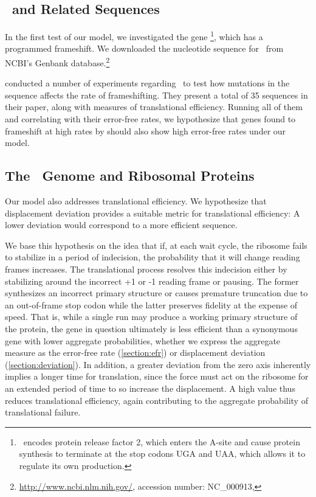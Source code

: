 \documentclass[12pt]{article}
\begin{document}
\subsection{\prfB\ and Related Sequences}
In the first test of our model, we investigated the gene
\prfB\footnote{\prfB\ encodes protein release factor 2, which enters
  the A-site and cause protein synthesis to terminate at the stop
  codons \textsc{UGA} and \textsc{UAA}, which allows it to regulate
  its own production.}, which has a programmed frameshift.
We downloaded the nucleotide sequence for \prfB\ from
NCBI's Genbank database.\footnote{\url{http://www.ncbi.nlm.nih.gov/},
  accession number: NC\_000913, \prfB}

\citet{weiss87} conducted a number of experiments regarding
\prfB\ to test how mutations in the sequence affects the rate of
frameshifting.  They present a total of 35 sequences in their paper,
along with measures of translational efficiency.  Running all of
them and correlating with their error-free rates, we hypothesize that
genes found to frameshift at high rates by
\citeauthor{weiss87} should also show high error-free rates under
our model.

\subsection{The \ecoli\ Genome and Ribosomal Proteins}
Our model also addresses
translational efficiency. We hypothesize that displacement deviation
provides a suitable metric for translational efficiency: A lower
deviation would correspond to a more efficient sequence.

We base this hypothesis on the idea that if, at each wait cycle, the
ribosome fails to stabilize in a period of indecision, the probability
that it will change reading frames increases. The translational
process resolves this indecision either by stabilizing around the
incorrect +1 or -1 reading frame or pausing. The former synthesizes an
incorrect primary structure or causes premature truncation due to an
out-of-frame stop codon while the latter preserves fidelity at the
expense of speed. That is, while a single run may produce
a working primary structure of the protein, the gene in question
ultimately is less efficient than a synonymous gene with lower
aggregate probabilities, whether we express the aggregate measure as the
error-free rate (\autoref{section:efr}) or displacement deviation
(\autoref{section:deviation}). In addition, a greater deviation from
the zero axis inherently implies a longer time for translation, since
the force must act on the ribosome for an extended period of time to
so increase the displacement. A high value thus reduces translational
efficiency, again contributing to the aggregate probability of
translational failure.
\end{document}
